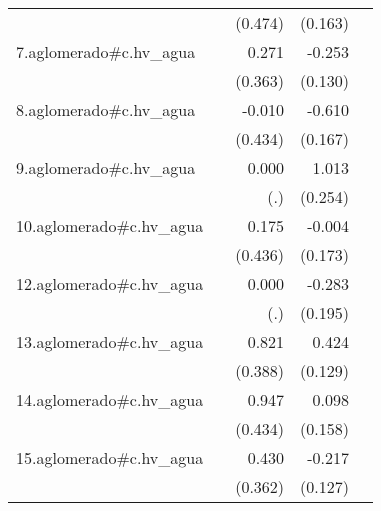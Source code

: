 {\begin{longtable}{l*{4}{D{.}{.}{-1}}}
            &                     &     (0.474)         &     (0.163)         &                     \\
\addlinespace
7.aglomerado#c.hv\_agua&                     &       0.271         &      -0.253         &                     \\
            &                     &     (0.363)         &     (0.130)         &                     \\
\addlinespace
8.aglomerado#c.hv\_agua&                     &      -0.010         &      -0.610\sym{***}&                     \\
            &                     &     (0.434)         &     (0.167)         &                     \\
\addlinespace
9.aglomerado#c.hv\_agua&                     &       0.000         &       1.013\sym{***}&                     \\
            &                     &         (.)         &     (0.254)         &                     \\
\addlinespace
10.aglomerado#c.hv\_agua&                     &       0.175         &      -0.004         &                     \\
            &                     &     (0.436)         &     (0.173)         &                     \\
\addlinespace
12.aglomerado#c.hv\_agua&                     &       0.000         &      -0.283         &                     \\
            &                     &         (.)         &     (0.195)         &                     \\
\addlinespace
13.aglomerado#c.hv\_agua&                     &       0.821\sym{*}  &       0.424\sym{**} &                     \\
            &                     &     (0.388)         &     (0.129)         &                     \\
\addlinespace
14.aglomerado#c.hv\_agua&                     &       0.947\sym{*}  &       0.098         &                     \\
            &                     &     (0.434)         &     (0.158)         &                     \\
\addlinespace
15.aglomerado#c.hv\_agua&                     &       0.430         &      -0.217         &                     \\
            &                     &     (0.362)         &     (0.127)         &                     \\

\end{longtable}}
